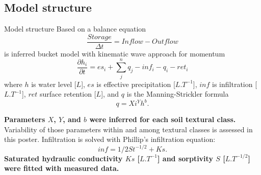 \subsection{Model structure}
\begin{block}{Model structure}
    Based on a balance equation 
    $$
        \frac{Storage}{\Delta t} = \nonumber  
        Inflow - Outflow
    $$
    is inferred bucket model with kinematic wave approach for momentum 
    $$
        \frac{\partial h_{i}}{\partial t} =  es_{i} + \sum_j^n q_{j} - inf_{i} - q_{i} - ret_i
    $$
    where $h$ is water level [$L$], $es$ is effective precipitation [$L.T^{-1}$], $inf$ is infiltration [$L.T^{-1}$], $ret$ surface retention [$L$], and $q$ is the Manning-Strickler formula
    \begin{equation}
      q = Xi^Yh^b. 
      \label{eq:manning}
    \end{equation}

    {\bf Parameters $X$, $Y$, and $b$ were inferred for each soil textural class.} Variability of those parameters within and among textural classes is assessed in this poster. Infiltration is solved with Phillip's infiltration equation:
    \begin{equation}
      inf = 1/2St^{-1/2} + Ks.
      \label{eq:Phillips}
    \end{equation}
    {\bf Saturated hydraulic conductivity $Ks$ [$L.T^{-1}$] and sorptivity $S$ [$L.T^{-1/2}$] were fitted with measured data.}
\end{block}



